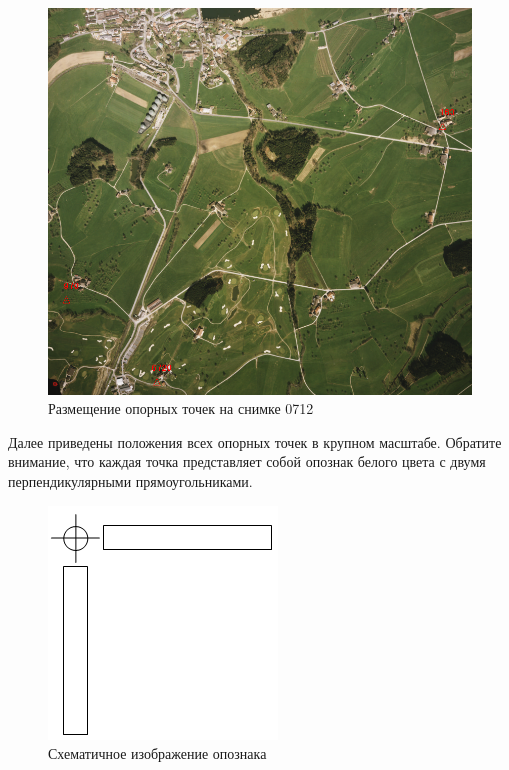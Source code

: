 \documentclass[
  12pt,
]{book}
\begin{document}
\begin{figure}
\centering
\includegraphics{images/Ref15/Image_0712.png}
\caption{Размещение опорных точек на снимке 0712}
\end{figure}

Далее приведены положения всех опорных точек в крупном масштабе. Обратите внимание, что каждая точка представляет собой опознак белого цвета с двумя перпендикулярными прямоугольниками.

\begin{figure}
\centering
\includegraphics{images/Ref15/Opoznak.png}
\caption{Схематичное изображение опознака}
\end{figure}
\end{document}
